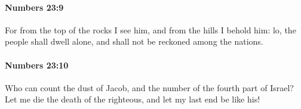 		\paragraph{Numbers 23:9} %
			\label{NUMBERS-23-9}

			For from the top of the rocks I see him, and from the hills I behold him: lo, the people shall dwell alone, and shall not be reckoned among the nations.


		\paragraph{Numbers 23:10} %
			\label{NUMBERS-23-10}

			Who can count the dust of Jacob, and the number of the fourth part of Israel? Let me die the death of the righteous, and let my last end be like his!


